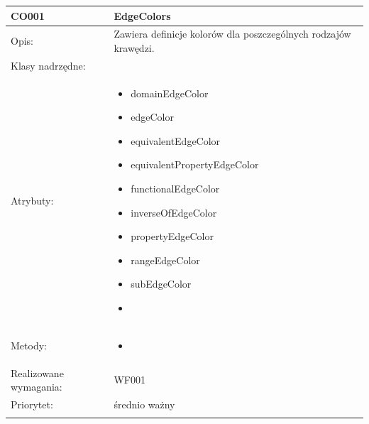 \documentclass[a4paper,10pt]{article}
\begin{document}
\begin{center}
 


\begin{longtable}{|m{3cm}|m{9cm}|} \hline

CO001 & EdgeColors \\ \hline
Opis: & Zawiera definicje kolorów dla poszczególnych rodzajów krawędzi.   \\ \hline
Klasy nadrzędne: &     \\ \hline
Atrybuty: & \begin{itemize}
 \item domainEdgeColor
 \item edgeColor
 \item equivalentEdgeColor
 \item equivalentPropertyEdgeColor
 \item functionalEdgeColor
 \item inverseOfEdgeColor
 \item propertyEdgeColor
 \item rangeEdgeColor
 \item subEdgeColor
 \item 
\end{itemize}
 \\ \hline
Metody: & \begin{itemize}
 \item 
\end{itemize}
  \\ \hline
Realizowane wymagania: & WF001 \\ \hline
Priorytet: & średnio ważny \\ \hline

\multicolumn{2}{c}{} \\
 \hline


\end{longtable}
\end{center}
\end{document}
